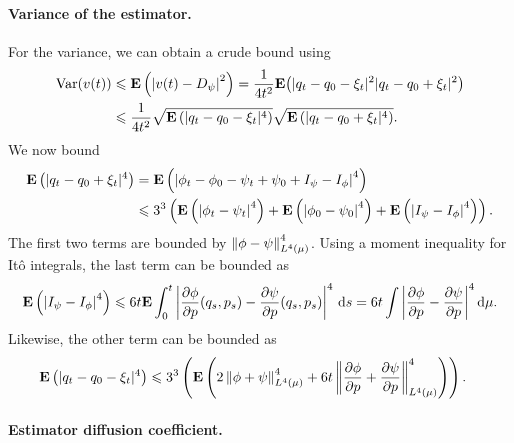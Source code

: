\documentclass[11pt,a4paper]{article}
\newcommand{\expect}[0]{\mathbf{E}}
\renewcommand{\d}{\mathrm d}
\theoremstyle{plain}
\numberwithin{equation}{section}
\renewcommand{\leq}{\leqslant}
\begin{document}
\paragraph{Variance of the estimator.}%
For the variance, we can obtain a crude bound using
\begin{align*}
    \mathrm{Var} (v(t))
    &\leq \expect \left( \abs{v(t) - D_{\psi}}^2 \right)
    = \frac{1}{4 t^2} \expect \big( |q_t - q_0 - \xi_t|^2 |q_t - q_0 + \xi_t|^2 \big) \\
    &\leq \frac{1}{4 t^2} \sqrt{\expect \left(  |q_t - q_0 - \xi_t|^4 \right)} \sqrt{\expect \left( |q_t - q_0 + \xi_t|^4 \right)}.
\end{align*}
We now bound
\begin{align*}
    \expect \left( |q_t - q_0 + \xi_t|^4 \right)
    &= \expect \left( \abs{\phi_t - \phi_0 - \psi_t + \psi_0 + I_{\psi} - I_{\phi}}^4 \right) \\
    &\leq 3^3 \left( \expect \left( \abs{\phi_t - \psi_t}^4 \right) + \expect \left( \abs{\phi_0 - \psi_0}^4 \right) + \expect \left( \abs{I_{\psi} - I_{\phi}}^4 \right) \right).
\end{align*}
The first two terms are bounded by $\norm{\phi - \psi}_{L^4(\mu)}^4$.
Using a moment inequality for It\^o integrals, the last term can be bounded as
\[
    \expect \left( \abs{I_{\psi} - I_{\phi}}^4 \right) \leq 6 t \expect \int_{0}^{t} \abs{\derivative{1}[\phi]{p}(q_s, p_s) - \derivative{1}[\psi]{p}(q_s, p_s)}^4 \, \d s = 6 t \int \abs{\derivative{1}[\phi]{p} - \derivative{1}[\psi]{p}}^4 \d \mu.
\]
Likewise, the other term can be bounded as
\begin{align*}
    \expect \left( |q_t - q_0 - \xi_t|^4 \right)
    &\leq 3^3 \left( \expect \left( 2 \norm{\phi + \psi}[L^4(\mu)]^4 + 6 t \norm{\derivative{1}[\phi]{p} + \derivative{1}[\psi]{p}}[L^{4}(\mu)]^4 \right) \right).
\end{align*}

\paragraph{Estimator diffusion coefficient.}%
\label{par:estimator_diffusion_coefficient}
\end{document}
